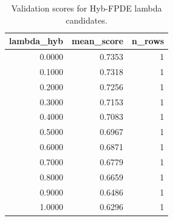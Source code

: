 \begin{table}[t]
\caption{Validation scores for Hyb-FPDE lambda candidates.}
\label{tab:lambda_distribution_computed}
\centering
\begin{tabular}{rrr}
\toprule
lambda\_hyb & mean\_score & n\_rows \\
\midrule
0.0000 & 0.7353 & 1 \\
0.1000 & 0.7318 & 1 \\
0.2000 & 0.7256 & 1 \\
0.3000 & 0.7153 & 1 \\
0.4000 & 0.7083 & 1 \\
0.5000 & 0.6967 & 1 \\
0.6000 & 0.6871 & 1 \\
0.7000 & 0.6779 & 1 \\
0.8000 & 0.6659 & 1 \\
0.9000 & 0.6486 & 1 \\
1.0000 & 0.6296 & 1 \\
\bottomrule
\end{tabular}

\end{table}
